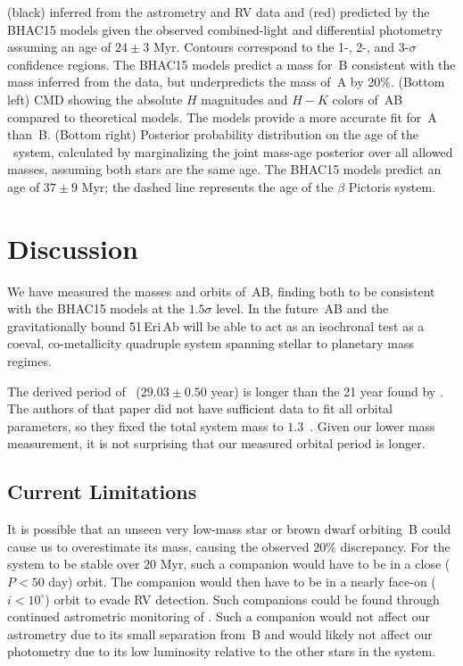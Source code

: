 \begin{FPfigure}
{(black) inferred from the astrometry and RV data and (red) predicted by the BHAC15 
models given the observed combined-light and differential photometry assuming
an age of $24 \pm 3$ Myr. Contours correspond
to the 1-, 2-, and 3-$\sigma$ confidence regions. The BHAC15 models predict a mass for
\thisstarsix\,B consistent with the mass inferred from the data, but underpredicts
the mass of \thisstarsix\,A by 20\%.
(Bottom left) CMD showing the absolute $H$ magnitudes and $H-K$ colors of \thisstarsix\,AB compared to theoretical
models. The models provide a more accurate fit for \thisstarsix\,A than \thisstarsix\,B.  
(Bottom right) Posterior probability distribution on the age of the \thisstarsix\ system, calculated by marginalizing the joint mass-age posterior over
all allowed masses, assuming both stars are the same age.
The BHAC15 models predict an age of $37 \pm 9$ Myr; the dashed line represents the \citet{Bell15} age of the $\beta$ Pictoris system.}
\label{fig:models}
\end{FPfigure}



\section{Discussion}


We have measured the masses and orbits of \thisstarsix\,AB, finding both to be 
consistent with the BHAC15 models at the $1.5\sigma$ level. 
In the future \thisstarsix\,AB and the gravitationally bound 51\,Eri\,Ab will be able to act as an isochronal test as a coeval,
co-metallicity quadruple system spanning stellar to planetary mass regimes.

The derived period of \thisstarsix\ ($29.03 \pm 0.50$ year) is longer than the 21 year found by \citet{Delorme12}.
The authors of that paper did not have sufficient data to fit all orbital parameters,
so they fixed the total system mass to $1.3$~\msun. Given our lower mass measurement, 
it is not surprising 
that our measured orbital period is longer. 

\subsection{Current Limitations}

It is possible that an unseen very low-mass star or brown dwarf orbiting
\thisstarsix\,B could cause us to overestimate its mass, causing the observed
$20\%$
discrepancy. 
For the system to be stable over $20$ Myr, such a companion would have to
be in a close ($P < 50$ day) orbit. 
The companion would then have to be in a nearly face-on ($i < 10^{\circ}$) orbit to evade RV detection.
Such companions could be found through continued astrometric monitoring of \thisstarsix. 
Such a companion would not affect our astrometry due to its small separation from \thisstarsix\,B
and would likely not affect our photometry due to its low luminosity relative to the other stars
in the system.

